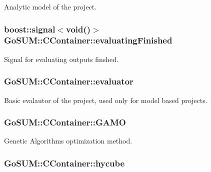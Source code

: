 Analytic model of the project. 

\hypertarget{class_go_s_u_m_1_1_c_container_a261e36612f2614a6fd79c87b0d432fab}{
\subsubsection[{evaluating\-Finished}]{\setlength{\rightskip}{0pt plus 5cm}boost\-::signal$<$void()$>$ Go\-S\-U\-M\-::\-C\-Container\-::evaluating\-Finished}}\label{class_go_s_u_m_1_1_c_container_a261e36612f2614a6fd79c87b0d432fab}


Signal for evaluating outputs finshed. 

\hypertarget{class_go_s_u_m_1_1_c_container_a230d7ca9d852616927abc46264a4c5e3}{
\subsubsection[{evaluator}]{ Go\-S\-U\-M\-::\-C\-Container\-::evaluator\hspace{0.3cm}{\ttfamily [private]}}}\label{class_go_s_u_m_1_1_c_container_a230d7ca9d852616927abc46264a4c5e3}


Basic evalautor of the project, used only for model based projects. 

\hypertarget{class_go_s_u_m_1_1_c_container_aea0201dad816660f2ee30bfa1b95093e}{
\subsubsection[{G\-A\-M\-O}]{ Go\-S\-U\-M\-::\-C\-Container\-::\-G\-A\-M\-O\hspace{0.3cm}{\ttfamily [private]}}}\label{class_go_s_u_m_1_1_c_container_aea0201dad816660f2ee30bfa1b95093e}


Genetic Algorithms optimization method. 

\hypertarget{class_go_s_u_m_1_1_c_container_a14f86f3146dee751a86ec07a2979790d}{
\subsubsection[{hycube}]{ Go\-S\-U\-M\-::\-C\-Container\-::hycube\hspace{0.3cm}{\ttfamily [private]}}}\label{class_go_s_u_m_1_1_c_container_a14f86f3146dee751a86ec07a2979790d}


